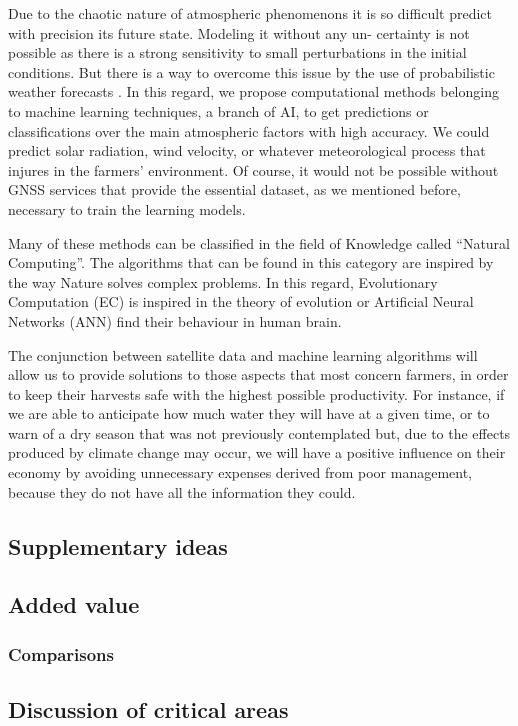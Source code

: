 Due to the chaotic nature of atmospheric phenomenons it is so difficult predict with precision its future state. Modeling it without any un- certainty is not possible as there is a strong sensitivity to small perturbations in the initial conditions. But there is a way to overcome this issue by the use of probabilistic weather forecasts \cite{martinez2015forecasting}. In this regard, we propose computational methods belonging to machine learning techniques, a branch of AI, to get predictions or classifications over the main atmospheric factors with high accuracy. We could predict solar radiation, wind velocity, or whatever meteorological process that injures in the farmers' environment. Of course, it would not be possible without GNSS services that provide the essential dataset, as we mentioned before, necessary to train the learning models.

Many of these methods can be classified in the field of Knowledge called “Natural Computing”. The algorithms that can be found in this category are inspired by the way Nature solves complex problems. In this regard, Evolutionary Computation (EC) is inspired in the theory of evolution or Artificial Neural Networks (ANN) find their behaviour in human brain.

The conjunction between satellite data and machine learning algorithms will allow us to provide solutions to those aspects that most concern farmers, in order to keep their harvests safe with the highest possible productivity. For instance, if we are able to anticipate how much water they will have at a given time, or to warn of a dry season that was not previously contemplated but, due to the effects produced by climate change may occur, we will have a positive influence on their economy by avoiding unnecessary expenses derived from poor management, because they do not have all the information they could.



\subsection{Supplementary ideas}
\subsection{Added value}
\subsubsection{Comparisons}	
\subsection{Discussion of critical areas}



